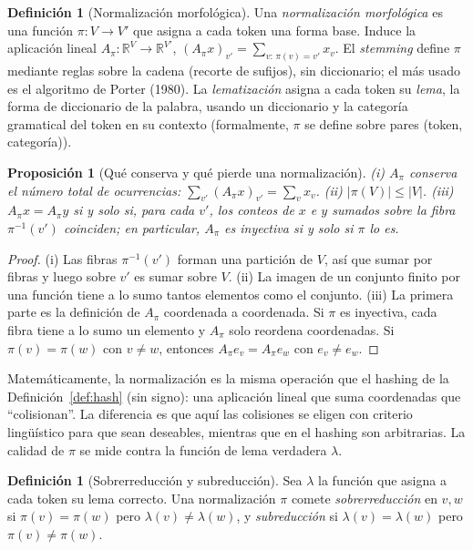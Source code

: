 \documentclass[11pt]{article}
\newtheorem{proposicion}[teorema]{Proposición}
\theoremstyle{definition}
\newtheorem{definicion}[teorema]{Definición}
\theoremstyle{remark}
\newcommand{\R}{\mathbb{R}}
\newcommand{\abs}[1]{\left\lvert #1\right\rvert}
\begin{document}
\begin{definicion}[Normalización morfológica]\label{def:normalizacion}
\noindent Una \emph{normalización morfológica} es una función $\pi:V\to V'$ que asigna a cada token una forma base. Induce la aplicación lineal $A_\pi:\R^V\to\R^{V'}$, $(A_\pi x)_{v'}=\sum_{v:\,\pi(v)=v'}x_v$. El \emph{stemming} define $\pi$ mediante reglas sobre la cadena (recorte de sufijos), sin diccionario; el más usado es el algoritmo de Porter (1980). La \emph{lematización} asigna a cada token su \emph{lema}, la forma de diccionario de la palabra, usando un diccionario y la categoría gramatical del token en su contexto (formalmente, $\pi$ se define sobre pares (token, categoría)).
\end{definicion}

\begin{proposicion}[Qué conserva y qué pierde una normalización]\label{prop:normalizacion}
\noindent (i) $A_\pi$ conserva el número total de ocurrencias: $\sum_{v'}(A_\pi x)_{v'}=\sum_vx_v$. (ii) $\abs{\pi(V)}\le\abs V$. (iii) $A_\pi x=A_\pi y$ si y solo si, para cada $v'$, los conteos de $x$ e $y$ sumados sobre la fibra $\pi^{-1}(v')$ coinciden; en particular, $A_\pi$ es inyectiva si y solo si $\pi$ lo es.
\end{proposicion}
\begin{proof}
\noindent (i) Las fibras $\pi^{-1}(v')$ forman una partición de $V$, así que sumar por fibras y luego sobre $v'$ es sumar sobre $V$. (ii) La imagen de un conjunto finito por una función tiene a lo sumo tantos elementos como el conjunto. (iii) La primera parte es la definición de $A_\pi$ coordenada a coordenada. Si $\pi$ es inyectiva, cada fibra tiene a lo sumo un elemento y $A_\pi$ solo reordena coordenadas. Si $\pi(v)=\pi(w)$ con $v\ne w$, entonces $A_\pi e_v=A_\pi e_w$ con $e_v\ne e_w$.
\end{proof}

\noindent Matemáticamente, la normalización es la misma operación que el hashing de la Definición~\ref{def:hash} (sin signo): una aplicación lineal que suma coordenadas que ``colisionan''. La diferencia es que aquí las colisiones se eligen con criterio lingüístico para que sean deseables, mientras que en el hashing son arbitrarias. La calidad de $\pi$ se mide contra la función de lema verdadera $\lambda$.

\begin{definicion}[Sobrerreducción y subreducción]\label{def:sobre}
\noindent Sea $\lambda$ la función que asigna a cada token su lema correcto. Una normalización $\pi$ comete \emph{sobrerreducción} en $v,w$ si $\pi(v)=\pi(w)$ pero $\lambda(v)\ne\lambda(w)$, y \emph{subreducción} si $\lambda(v)=\lambda(w)$ pero $\pi(v)\ne\pi(w)$.
\end{definicion}
\end{document}
